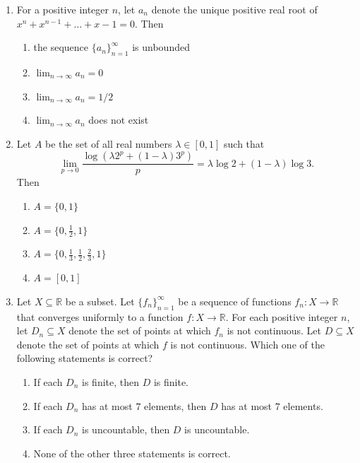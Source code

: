 \documentclass[11pt, a4paper]{article}
\begin{document}
\begin{enumerate}
  \item For a positive integer $n$, let $a_n$ denote the unique positive real root of $x^n + x^{n-1} + \dots + x - 1 = 0$. Then
  \begin{enumerate}[label=(\alph*)]
    \item the sequence $\{a_n\}_{n=1}^\infty$ is unbounded
    \item $\lim_{n \to \infty} a_n = 0$
    \item $\lim_{n \to \infty} a_n = 1/2$
    \item $\lim_{n \to \infty} a_n$ does not exist
  \end{enumerate}

  \item Let $A$ be the set of all real numbers $\lambda \in [0,1]$ such that
  \[
    \lim_{p \to 0} \frac{\log(\lambda 2^p + (1 - \lambda) 3^p)}{p} = \lambda \log 2 + (1 - \lambda) \log 3.
  \]
  Then
  \begin{enumerate}[label=(\alph*)]
    \item $A = \{0, 1\}$
    \item $A = \{0, \frac{1}{2}, 1\}$
    \item $A = \{0, \frac{1}{3}, \frac{1}{2}, \frac{2}{3}, 1\}$
    \item $A = [0, 1]$
  \end{enumerate}

  \item Let $X \subseteq \mathbb{R}$ be a subset. Let $\{f_n\}_{n=1}^\infty$ be a sequence of functions $f_n: X \to \mathbb{R}$ that converges uniformly to a function $f: X \to \mathbb{R}$. For each positive integer $n$, let $D_n \subseteq X$ denote the set of points at which $f_n$ is not continuous. Let $D \subseteq X$ denote the set of points at which $f$ is not continuous. Which one of the following statements is correct?
  \begin{enumerate}[label=(\alph*)]
    \item If each $D_n$ is finite, then $D$ is finite.
    \item If each $D_n$ has at most $7$ elements, then $D$ has at most $7$ elements.
    \item If each $D_n$ is uncountable, then $D$ is uncountable.
    \item None of the other three statements is correct.
  \end{enumerate}


\end{enumerate}
\end{document}
